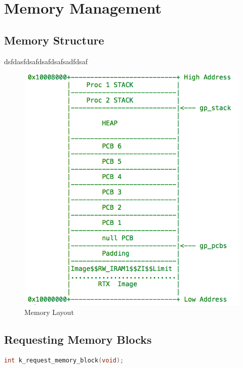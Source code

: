 \documentclass[12pt]{report}
\begin{document}
\section{Memory Management}

\subsection{Memory Structure}

dsfdasfdsafdsafdsafsadfdsaf

\begin{figure}
	\includegraphics{memory.png}
\caption{Memory Layout}

\end{figure}

\subsection{Requesting Memory Blocks}

\begin{minipage}{\textwidth}
\begin{lstlisting}[language=C, frame=single]
int k_request_memory_block(void);
\end{lstlisting}
\end{minipage}
\end{document}
